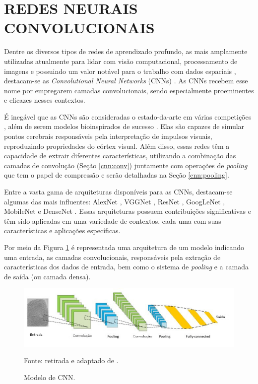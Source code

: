 \newpage
\clearpage

\section{REDES NEURAIS CONVOLUCIONAIS}
\label{cnn}

Dentre os diversos tipos de redes de aprendizado profundo, as mais amplamente utilizadas atualmente para lidar com visão computacional, processamento de imagens e possuindo um valor notável para o trabalho com dados espaciais \citep{Goodfellow2016, ponti2018funciona, Ghosh2019}, destacam-se as \textit{Convolutional Neural Networks} (CNNs) \citep{LeCun1999}. As CNNs recebem esse nome por empregarem camadas convolucionais, sendo especialmente proeminentes e eficazes nesses contextos.

É inegável que as CNNs são consideradas o estado-da-arte em várias competições \citep{Parkhi2015}, além de serem modelos bioinspirados de sucesso \citep{Goodfellow2016}. Elas são capazes de simular pontos cerebrais responsáveis pela interpretação de impulsos visuais, reproduzindo propriedades do córtex visual. Além disso, essas redes têm a capacidade de extrair diferentes características, utilizando a combinação das camadas de convolução (Seção \ref{cnn:conv}) juntamente com operações de \textit{pooling} que tem o papel de compressão e serão detalhadas na Seção \ref{cnn:pooling}.

Entre a vasta gama de arquiteturas disponíveis para as CNNs, destacam-se algumas das mais influentes: AlexNet \citep{krizhevsky2012imagenet}, VGGNet \citep{Simonyan2015}, ResNet \citep{He2016}, GoogLeNet \citep{Szegedy2015}, MobileNet \citep{Howard2017} e DenseNet \citep{Huang2017}. Essas arquiteturas possuem contribuições significativas e têm sido aplicadas em uma variedade de contextos, cada uma com suas características e aplicações específicas.

Por meio da Figura \ref{cnn:fig:10} é representada uma arquitetura de um modelo indicando uma entrada, as camadas convolucionais,  responsáveis pela extração de características dos dados de entrada, bem como o sistema de \textit{pooling} e a camada de saída (ou camada densa).

\begin{figure}[H]
    \centering
    \caption{Modelo de CNN.}
    \includegraphics[width=1\linewidth]{recursos/imagens/deep/cnn.jpg}
    \label{cnn:fig:10}

    Fonte: retirada e adaptado de \cite{Minaee2021DeepClassification}.
\end{figure}

